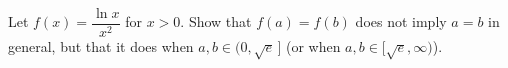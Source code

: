 Let $f(x)=\dfrac{\ln x}{x^2}$ for $x>0$. Show that $f(a)=f(b)$ does not imply $a=b$ in general, but that it does when $a,b\in(0,\sqrt e\,]$ (or when $a,b\in[\sqrt e,\infty)$).
